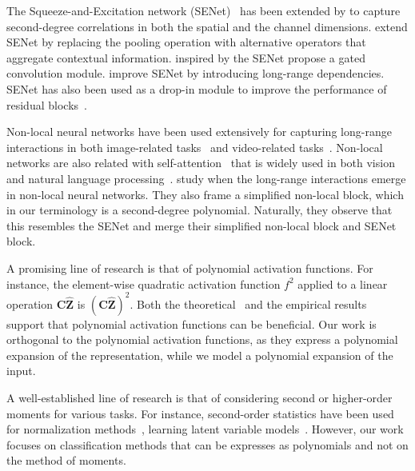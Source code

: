 \documentclass[runningheads]{llncs}
\newcommand{\sne}{SENet}
\providecommand{\minvar}{\bm{Z}}
\providecommand{\mvinvar}{\hat{\minvar}}
\providecommand{\citet}{\cite}
\begin{document}
The Squeeze-and-Excitation network (\sne)~\cite{hu2018squeeze} has been extended by \citet{roy2018concurrent} to capture second-degree correlations in both the spatial and the channel dimensions. \cite{hu2018gather} extend \sne{} by replacing the pooling operation with alternative operators that aggregate contextual information. \citet{yang2020gated} inspired by the \sne{} propose a gated convolution module. \citet{ruan2020linear} improve \sne{} by introducing long-range dependencies. \sne{} has also been used as a drop-in module to improve the performance of residual blocks~\cite{gao2019res2net}. 



Non-local neural networks have been used extensively for capturing long-range interactions in both image-related tasks~\cite{li2020neural, zhu2019asymmetric, huang2019ccnet} and video-related tasks~\cite{chen20182, girdhar2019video}. Non-local networks are also related with self-attention~\cite{vaswani2017attention} that is widely used in both vision~\cite{parmar2019stand} and natural language processing~\cite{galassi2019attention, ma2019tensorized}. 
\citet{cao2019gcnet} study when the long-range interactions emerge in non-local neural networks. They also frame a simplified non-local block, which in our terminology is a second-degree polynomial. Naturally, they observe that this resembles the \sne{} and merge their simplified non-local block and \sne{} block. 



A promising line of research is that of polynomial activation functions. For instance, the element-wise quadratic activation function $f^2$ applied to a linear operation $\bm{C}\mvinvar$ is $(\bm{C}\mvinvar)^2$. Both the theoretical~\cite{kileel2019expressive, livni2014computational} and the empirical results~\cite{ramachandran2017searching, lokhande2020generating} support that polynomial activation functions can be beneficial. Our work is orthogonal to the polynomial activation functions, as they express a polynomial expansion of the representation, while we model a polynomial expansion of the input.



A well-established line of research is that of considering second or higher-order moments for various tasks. For instance, second-order statistics have been used for normalization methods~\cite{huang2018decorrelated}, learning latent variable models~\cite{anandkumar2014tensor}. However, our work focuses on classification methods that can be expresses as polynomials and not on the method of moments. 
\end{document}
